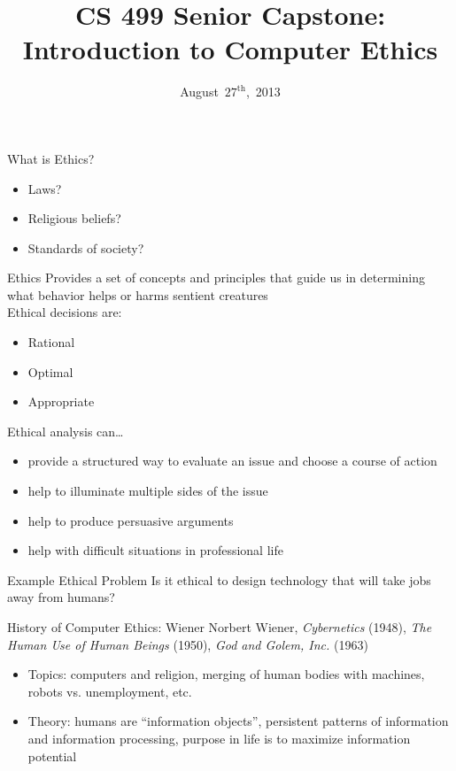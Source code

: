 \documentclass{beamer}
\title[Introduction to Computer Ethics]{CS 499 Senior Capstone: \\ Introduction to Computer Ethics}
\date{August~$27^{\text{th}}$,~2013}
\begin{document}
\begin{frame}
\titlepage
\end{frame}

\begin{frame}{What is Ethics?}
\begin{itemize}
\item Laws?
\bigskip
\item Religious beliefs?
\bigskip
\item Standards of society?
\end{itemize}
\end{frame}

\begin{frame}{Ethics}
Provides a set of concepts and principles that guide us in determining what behavior helps or harms sentient creatures\\
\bigskip
\bigskip
Ethical decisions are:
\begin{itemize}
\item Rational
\item Optimal
\item Appropriate
\end{itemize}
\end{frame}

\begin{frame}{Ethical analysis can\ldots}
\begin{itemize}
\item provide a structured way to evaluate an issue and choose a course of action
\bigskip
\item help to illuminate multiple sides of the issue
\bigskip
\item help to produce persuasive arguments
\bigskip
\item help with difficult situations in professional life 
\end{itemize}
\end{frame}

\begin{frame}{Example Ethical Problem}
Is it ethical to design technology that will take jobs away from humans?
\end{frame}

\begin{frame}{History of Computer Ethics: Wiener}
Norbert Wiener, \emph{Cybernetics} (1948), \emph{The Human Use of Human Beings} (1950), \emph{God and Golem, Inc.} (1963)
\begin{itemize}
\item Topics: computers and religion, merging of human bodies with machines, robots vs. unemployment, etc.
\item Theory: humans are ``information objects'', persistent patterns of information and information processing, purpose in life is to maximize information potential
\end{itemize}
\end{frame}
\end{document}
